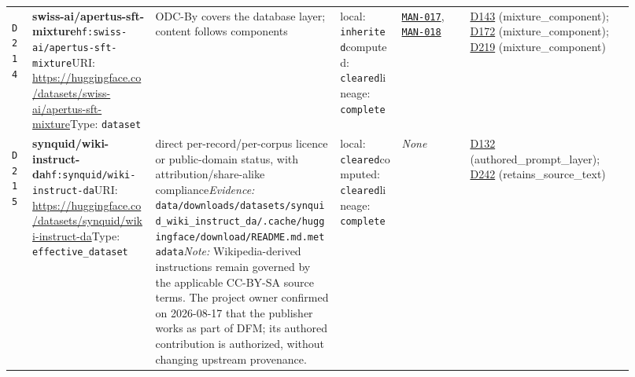 \documentclass[9pt,a4paper]{article}
\newcommand{\depid}[1]{\hypertarget{dep:#1}{\texttt{#1}}}
\begin{document}
\begin{landscape}
\begin{longtable}{@{}L{0.035\linewidth}L{0.185\linewidth}L{0.27\linewidth}L{0.09\linewidth}L{0.10\linewidth}L{0.24\linewidth}@{}}
\depid{D214} & \textbf{swiss-ai/apertus-sft-mixture}\newline \nolinkurl{hf:swiss-ai/apertus-sft-mixture}\newline URI: \url{https://huggingface.co/datasets/swiss-ai/apertus-sft-mixture}\newline Type: \texttt{dataset} & ODC-By covers the database layer; content follows components & local: \texttt{inherited}\newline computed: \texttt{cleared}\newline lineage: \texttt{complete} & \hyperlink{manual:MAN-017}{\texttt{MAN-017}}, \hyperlink{manual:MAN-018}{\texttt{MAN-018}} & \hyperlink{dep:D143}{D143} (mixture\_component); \hyperlink{dep:D172}{D172} (mixture\_component); \hyperlink{dep:D219}{D219} (mixture\_component) \\
\depid{D215} & \textbf{synquid/wiki-instruct-da}\newline \nolinkurl{hf:synquid/wiki-instruct-da}\newline URI: \url{https://huggingface.co/datasets/synquid/wiki-instruct-da}\newline Type: \texttt{effective\_dataset} & direct per-record/per-corpus licence or public-domain status, with attribution/share-alike compliance\newline \textit{Evidence:} \nolinkurl{data/downloads/datasets/synquid_wiki_instruct_da/.cache/huggingface/download/README.md.metadata}\newline \textit{Note:} Wikipedia-derived instructions remain governed by the applicable CC-BY-SA source terms. The project owner confirmed on 2026-08-17 that the publisher works as part of DFM; its authored contribution is authorized, without changing upstream provenance. & local: \texttt{cleared}\newline computed: \texttt{cleared}\newline lineage: \texttt{complete} & \textit{None} & \hyperlink{dep:D132}{D132} (authored\_prompt\_layer); \hyperlink{dep:D242}{D242} (retains\_source\_text) \\

\end{longtable}
\end{landscape}
\end{document}
